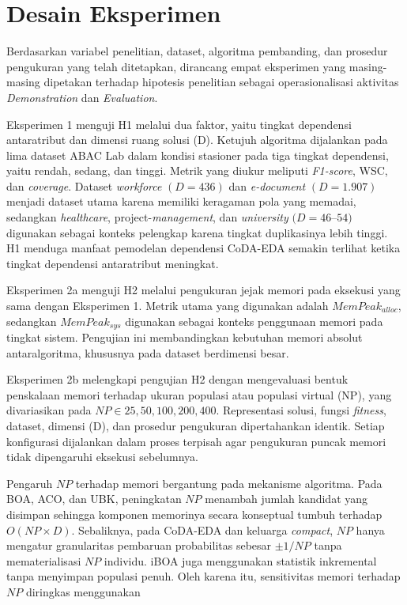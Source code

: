 \section{Desain Eksperimen}

Berdasarkan variabel penelitian, dataset, algoritma pembanding, dan prosedur pengukuran yang telah ditetapkan, dirancang empat eksperimen yang masing-masing dipetakan terhadap hipotesis penelitian sebagai operasionalisasi aktivitas \textit{Demonstration} dan \textit{Evaluation}.

Eksperimen 1 menguji H1 melalui dua faktor, yaitu tingkat dependensi antaratribut dan dimensi ruang solusi (D). 
Ketujuh algoritma dijalankan pada lima dataset ABAC Lab dalam kondisi stasioner pada tiga tingkat dependensi, yaitu rendah, sedang, dan tinggi. 
Metrik yang diukur meliputi \textit{F1-score}, WSC, dan \textit{coverage}. 
Dataset \textit{workforce} $(D=436)$ dan \textit{e-document} $(D=1.907)$ menjadi dataset utama karena memiliki keragaman pola yang memadai, sedangkan \textit{healthcare}, project-\textit{management}, dan \textit{university} $(D=46$–$54)$ digunakan sebagai konteks pelengkap karena tingkat duplikasinya lebih tinggi. 
H1 menduga manfaat pemodelan dependensi CoDA-EDA semakin terlihat ketika tingkat dependensi antaratribut meningkat.

Eksperimen 2a menguji H2 melalui pengukuran jejak memori pada eksekusi yang sama dengan Eksperimen 1. 
Metrik utama yang digunakan adalah $MemPeak_{alloc}$, sedangkan $MemPeak_{sys}$ digunakan sebagai konteks penggunaan memori pada tingkat sistem. 
Pengujian ini membandingkan kebutuhan memori absolut antaralgoritma, khususnya pada dataset berdimensi besar.

Eksperimen 2b melengkapi pengujian H2 dengan mengevaluasi bentuk penskalaan memori terhadap ukuran populasi atau populasi virtual (NP), yang divariasikan pada
$
NP\in{25,50,100,200,400}.
$
Representasi solusi, fungsi \textit{fitness}, dataset, dimensi (D), dan prosedur pengukuran dipertahankan identik. 
Setiap konfigurasi dijalankan dalam proses terpisah agar pengukuran puncak memori tidak dipengaruhi eksekusi sebelumnya.

Pengaruh $NP$ terhadap memori bergantung pada mekanisme algoritma. 
Pada BOA, ACO, dan UBK, peningkatan $NP$ menambah jumlah kandidat yang disimpan sehingga komponen memorinya secara konseptual tumbuh terhadap $O(NP\times D)$. 
Sebaliknya, pada CoDA-EDA dan keluarga \textit{compact}, $NP$ hanya mengatur granularitas pembaruan probabilitas sebesar $\pm1/NP$ tanpa mematerialisasi $NP$ individu. 
iBOA juga menggunakan statistik inkremental tanpa menyimpan populasi penuh. 
Oleh karena itu, sensitivitas memori terhadap $NP$ diringkas menggunakan

